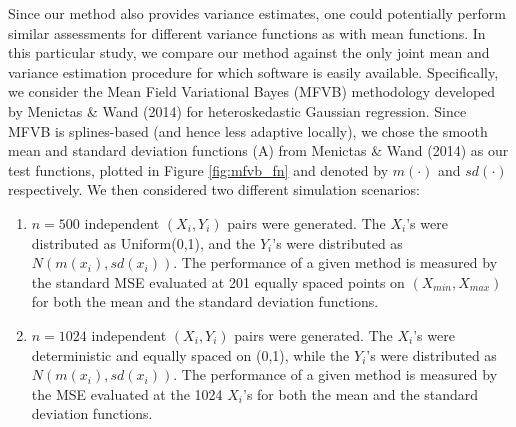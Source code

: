 \documentclass[12pt]{article}
\begin{document}
Since our method also provides variance estimates, one could potentially perform similar assessments for different variance functions as with mean functions. In this particular study, we compare our method against the only joint mean and variance estimation procedure for which software is easily available. Specifically, we consider the Mean Field Variational Bayes (MFVB) methodology developed by Menictas \& Wand (2014) for heteroskedastic Gaussian regression. Since MFVB is splines-based (and hence less adaptive locally), we chose the smooth mean and standard deviation functions (A) from Menictas \& Wand (2014) as our test functions, plotted in Figure \ref{fig:mfvb_fn} and denoted by $m(\cdot)$ and $sd(\cdot)$ respectively. We then considered two different simulation scenarios:
\begin{enumerate}
\item $n=500$ independent $(X_i,Y_i)$ pairs were generated. The $X_i$'s were distributed as Uniform(0,1), and the $Y_i$'s were distributed as $N(m(x_i),sd(x_i))$. The performance of a given method is measured by the standard MSE evaluated at 201 equally spaced points on $(X_{min},X_{max})$ for both the mean and the standard deviation functions.
\item $n=1024$ independent $(X_i,Y_i)$ pairs were generated. The $X_i$'s were deterministic and equally spaced on (0,1), while the $Y_i$'s were distributed as $N(m(x_i),sd(x_i))$. The performance of a given method is measured by the MSE evaluated at the 1024 $X_i$'s for both the mean and the standard deviation functions.
\end{enumerate}
\end{document}
